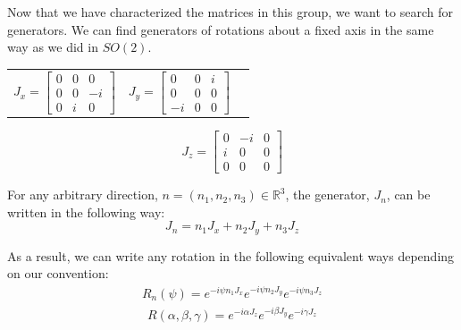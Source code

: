 \documentclass[compress,aspectratio=169,10pt,usenames,dvipsnames]{beamer}
\newcommand{\R}{\mathbb{R}}
\begin{document}
\begin{frame}
\vfill
Now that we have characterized the matrices in this group, we want to search for generators.
\vfill
We can find generators of rotations about a fixed axis in the same way as we did in $SO(2)$.
\vfill
\begin{center}
\begin{tabular}{ccc}
		$		J_x = \begin{bmatrix}
					0 & 0 & 0 \\
					0 & 0 & -i \\
					0 & i & 0
					\end{bmatrix}$
&
		$		J_y = \begin{bmatrix}
					0 & 0 & i \\
					0 & 0 & 0 \\
					-i & 0 & 0
					\end{bmatrix}$
\end{tabular}
		$$J_z = \begin{bmatrix}
					0 & -i & 0 \\
					i & 0 & 0 \\
					0 & 0 & 0
					\end{bmatrix}$$
\end{center}
\end{frame}
%
%
\begin{frame}
\vfill
\begin{theorem}
	 For any arbitrary direction, $n=(n_1,n_2,n_3)\in\R^3$, the generator, $J_n$, can be written in the following way:
$$J_n = n_1J_x + n_2J_y + n_3J_z$$
\end{theorem}
\vfill
As a result, we can write any rotation in the following equivalent ways depending on our convention:
\begin{equation}
	\begin{aligned}
		R_n(\psi) = e^{-i\psi n_1J_x}e^{-i\psi n_2J_y}e^{-i\psi n_3J_z}
	\end{aligned}
\end{equation} 
\begin{equation}
	\begin{aligned}
		R(\alpha,\beta,\gamma) = e^{-i\alpha J_z}e^{-i\beta J_y}e^{-i\gamma J_z}
	\end{aligned}
\end{equation} 
\end{frame}
\end{document}
